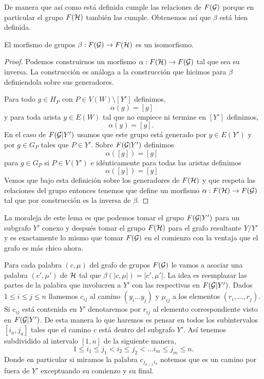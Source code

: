 \documentclass[tesis.tex]{subfiles}
\begin{document}
De manera que así como está definida cumple las relaciones de $F({\cal G})$ porque en particular el grupo $F({\cal H})$ también las cumple.
Obtenemos así que $\beta$ está bien definida.

\begin{lema}\label{lema_reduc_isomorfismo_beta}
	El morfismo de grupos $\beta:F({\cal G}) \to F({\cal H})$ es un isomorfismo. 
\end{lema}
\begin{proof}
	Podemos construirnos un morfismo $\alpha:F({\cal H}) \to F({\cal G})$ tal que sea su inversa.
	La construcción es análoga a la construcción que hicimos para $\beta$ definiendola sobre sus generadores.
	
	Para todo $g \in H_P$ con $P \in V(W) \setminus [Y'] $ definimos,
	\begin{equation*}
		\alpha(g) = [g]  \ \ 
	\end{equation*}
	y para toda arista $ y \in E(W)$ tal que no empiece ni termine en $[Y']$ definimos,
	\begin{equation*}
		\alpha(y) = [y].  \ \ \ 
	\end{equation*}
	En el caso de $F({\cal G} | Y')$ usamos que este grupo está generado por $y \in E(Y')$ y por $g \in G_{P}$ tales que $P \in Y'$.
	Sobre $F({\cal G} | Y')$ definimos 
	\begin{equation*}
		\alpha([g]) = [g]  \ \ 
	\end{equation*}
	para $g \in G_P$ si $P \in V(Y')$ e idénticamente para todas las aristas definimos
	\begin{equation*}
		\alpha([y]) = [y]  \ \ 
	\end{equation*}
	Vemos que bajo esta definición sobre los generadores de $F({\cal H})$ y que respeta las relaciones del grupo entonces tenemos que define un morfismo $\alpha:F({\cal H}) \to F({\cal G})$ tal que por construcción es la inversa de $\beta$.
\end{proof}

La moraleja de este lema es que podemos tomar el grupo $F({\cal G} | Y')$ para un subgrafo $Y'$ conexo y después tomar el grupo $F({\cal H})$ para el grafo resultante $Y / Y'$ y es exactamente lo mismo que tomar $F({\cal G})$ en el comienzo con la ventaja que el grafo es más chico ahora.

Para cada palabra $(c, \mu)$ del grafo de grupos $F({\cal G})$ le vamos a asociar una palabra $(c', \mu')$ de ${\cal H}$ tal que $\beta (|c,\mu|) = |c',\mu'|$.
La idea es reemplazar las partes de la palabra que involucren a $Y'$ con las respectivas en $F({\cal G} | Y')$.
Dados $ 1 \le i \le j \le n$ llamemos $c_{ij}$ al camino 
$(y_i \dots y_{j})$ y $\mu_{ij}$ a los elementos $(r_i, \dots, r_j)$.
Si $c_{ij}$ está contenida en $Y'$ denotaremos por $r_{ij}$ al elemento correspondiente visto en $F({\cal G} | Y')$.
De esta manera lo que haremos es pensar en todos los subintervalos $[i_a,j_a]$  tales que el camino $c$ está dentro del subgrafo $Y'$.
Así tenemos subdividido al intervalo $[1,n]$ de la siguiente manera,
\[
	1\le i_1 \le j_1 < i_2 \le j_2 < \dots i_m \le j_m \le n.
\]
Donde en particular si miramos la palabra $c_{j_{a-1}i_a}$ notemos que es un camino por fuera de $Y'$ exceptuando su comienzo y su final.
\end{document}
